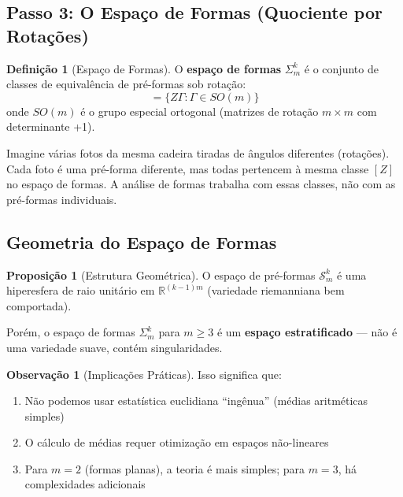 \documentclass[12pt,a4paper]{article}
\theoremstyle{definition}
\newtheorem{definicao}{Definição}[section]
\newtheorem{observacao}{Observação}[section]
\newtheorem{proposicao}{Proposição}[section]
\begin{document}
\subsection{Passo 3: O Espaço de Formas (Quociente por Rotações)}

\begin{definicao}[Espaço de Formas]
O \textbf{espaço de formas} $\Sigma_m^k$ é o conjunto de classes de equivalência de pré-formas sob rotação:
\begin{equation}
[Z] = \{Z\Gamma : \Gamma \in SO(m)\}
\end{equation}
onde $SO(m)$ é o grupo especial ortogonal (matrizes de rotação $m \times m$ com determinante +1).
\end{definicao}

\begin{tcolorbox}[caixaconceito={Analogia: Fotos da Mesma Pessoa}]
Imagine várias fotos da mesma cadeira tiradas de ângulos diferentes (rotações). Cada foto é uma pré-forma diferente, mas todas pertencem à mesma classe $[Z]$ no espaço de formas. A análise de formas trabalha com essas classes, não com as pré-formas individuais.
\end{tcolorbox}

\subsection{Geometria do Espaço de Formas}

\begin{proposicao}[Estrutura Geométrica]
O espaço de pré-formas $\mathcal{S}_m^k$ é uma hiperesfera de raio unitário em $\mathbb{R}^{(k-1)m}$ (variedade riemanniana bem comportada).

Porém, o espaço de formas $\Sigma_m^k$ para $m \geq 3$ é um \textbf{espaço estratificado} --- não é uma variedade suave, contém singularidades.
\end{proposicao}

\begin{observacao}[Implicações Práticas]
Isso significa que:
\begin{enumerate}
    \item Não podemos usar estatística euclidiana ``ingênua'' (médias aritméticas simples)
    \item O cálculo de médias requer otimização em espaços não-lineares
    \item Para $m=2$ (formas planas), a teoria é mais simples; para $m=3$, há complexidades adicionais
\end{enumerate}
\end{observacao}
\end{document}
